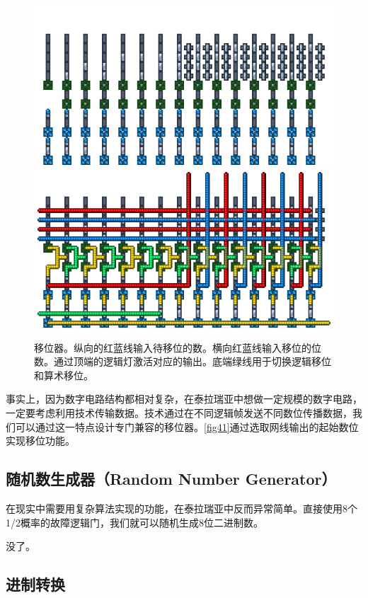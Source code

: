 \begin{figure}[!ht]
\centering
\includegraphics{images/417.png}
\qquad
\includegraphics{images/418.png}
\caption{移位器。纵向的红蓝线输入待移位的数。横向红蓝线输入移位的位数。通过顶端的逻辑灯激活对应的输出。底端绿线用于切换逻辑移位和算术移位。}\label{fig41}
\end{figure}

事实上，因为数字电路结构都相对复杂，在泰拉瑞亚中想做一定规模的数字电路，一定要考虑利用技术传输数据。技术通过在不同逻辑帧发送不同数位传播数据，我们可以通过这一特点设计专门兼容的移位器。\autoref{fig41}通过选取网线输出的起始数位实现移位功能。

\subsection{随机数生成器（Random Number Generator）}
在现实中需要用复杂算法实现的功能，在泰拉瑞亚中反而异常简单。直接使用8个1/2概率的故障逻辑门，我们就可以随机生成8位二进制数。
\vspace{5cm}

没了。

\subsection{进制转换}

